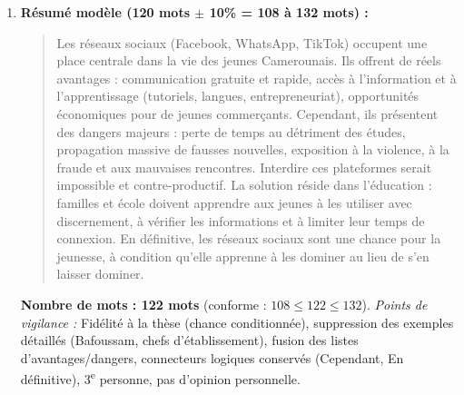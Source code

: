 \documentclass[11pt]{article}
\begin{document}
\begin{corrige}
\begin{enumerate}
\begin{enumerate}
\end{enumerate}
\item \textbf{Résumé modèle (120 mots $\pm$ 10\% = 108 à 132 mots) :}
\begin{quote}
Les réseaux sociaux (Facebook, WhatsApp, TikTok) occupent une place centrale dans la vie des jeunes Camerounais. Ils offrent de réels avantages : communication gratuite et rapide, accès à l'information et à l'apprentissage (tutoriels, langues, entrepreneuriat), opportunités économiques pour de jeunes commerçants. Cependant, ils présentent des dangers majeurs : perte de temps au détriment des études, propagation massive de fausses nouvelles, exposition à la violence, à la fraude et aux mauvaises rencontres. Interdire ces plateformes serait impossible et contre-productif. La solution réside dans l'éducation : familles et école doivent apprendre aux jeunes à les utiliser avec discernement, à vérifier les informations et à limiter leur temps de connexion. En définitive, les réseaux sociaux sont une chance pour la jeunesse, à condition qu'elle apprenne à les dominer au lieu de s'en laisser dominer.
\end{quote}
\textbf{Nombre de mots : 122 mots} (conforme : $108 \le 122 \le 132$).
\textit{Points de vigilance :} Fidélité à la thèse (chance conditionnée), suppression des exemples détaillés (Bafoussam, chefs d'établissement), fusion des listes d'avantages/dangers, connecteurs logiques conservés (Cependant, En définitive), 3\textsuperscript{e} personne, pas d'opinion personnelle.
\end{enumerate}
\end{corrige}
\end{document}
